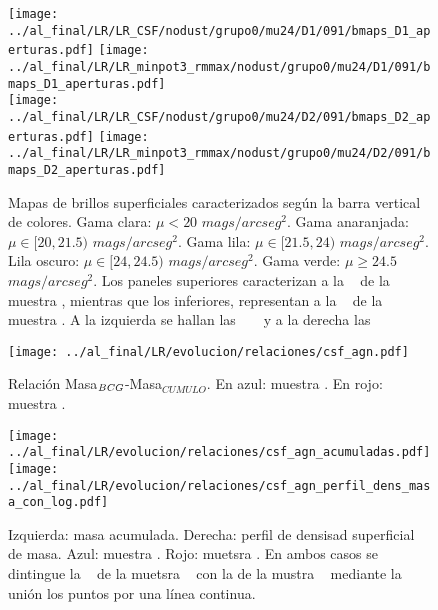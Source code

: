 \begin{figure}[H]
 \hspace*{-0.5cm}
 \texttt{[image: ../al\_final/LR/LR\_CSF/nodust/grupo0/mu24/D1/091/bmaps\_D1\_aperturas.pdf]}
 \hspace*{-0.27cm}
 \texttt{[image: ../al\_final/LR/LR\_minpot3\_rmmax/nodust/grupo0/mu24/D1/091/bmaps\_D1\_aperturas.pdf]}
 \\
  \hspace*{-0.5cm}
 \texttt{[image: ../al\_final/LR/LR\_CSF/nodust/grupo0/mu24/D2/091/bmaps\_D2\_aperturas.pdf]}
 \hspace*{-0.27cm}
 \texttt{[image: ../al\_final/LR/LR\_minpot3\_rmmax/nodust/grupo0/mu24/D2/091/bmaps\_D2\_aperturas.pdf]}
\caption{Mapas de brillos superficiales caracterizados seg\'un la barra vertical de colores.
Gama clara:  $\mu<20$ $mags/arcseg^{2}$.
Gama anaranjada:  $\mu \in [20,21.5)$ $mags/arcseg^{2}$.
Gama lila:  $\mu \in [21.5,24)$ $mags/arcseg^{2}$. 
Lila oscuro:  $\mu \in [24,24.5)$ $mags/arcseg^{2}$.
Gama verde:  $\mu\geq24.5$ $mags/arcseg^{2}$.
Los paneles superiores caracterizan a la
\bcg~ de la muestra \cmay, mientras que los inferiores, representan a la \bcg~ de la muestra \cmen.
A la izquierda se hallan las \bcgs~ \agnoff~ y a la derecha las \agnon}
\label{fig:csfmap}
\end{figure}


\begin{figure}[H]
 \centering
 \texttt{[image: ../al\_final/LR/evolucion/relaciones/csf\_agn.pdf]}
\caption{Relaci\'on Masa$_{{\it BCG}}$-Masa$_{CUMULO}$. En azul: muestra \agnoff.
En rojo: muestra \agnon.}
\label{fig:csfmbcgmh}
 \end{figure}

\begin{figure}[H]
 \texttt{[image: ../al\_final/LR/evolucion/relaciones/csf\_agn\_acumuladas.pdf]}
 \texttt{[image: ../al\_final/LR/evolucion/relaciones/csf\_agn\_perfil\_dens\_masa\_con\_log.pdf]}
 \caption{Izquierda: masa acumulada. Derecha: perfil de densisad superficial de masa. Azul: muestra \agnoff. Rojo:  muetsra \agnon. 
 En ambos casos se dintingue la \bcg~ de la muetsra \cmen~ con la
 de la mustra \cmay~ mediante la uni\'on los puntos por una l\'inea continua.}
\label{fig:csfperfiles}
 \end{figure}

